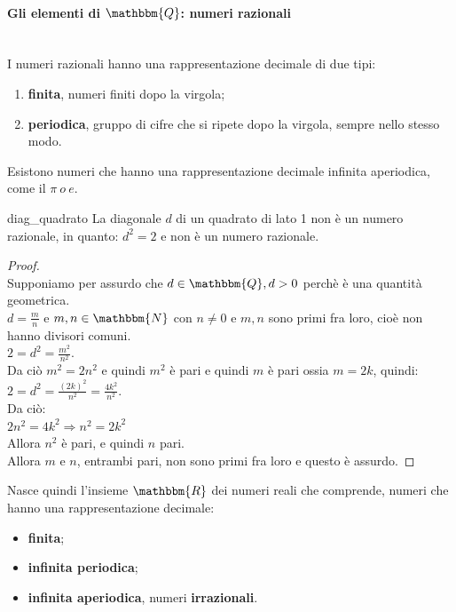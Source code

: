 \documentclass[12pt]{report}
\newcounter{theorem}
\begin{document}
	\paragraph{Gli elementi di $\mathbbm{Q}$: numeri razionali} \quad \\
	I numeri razionali hanno una rappresentazione decimale di due tipi:
	\begin{enumerate}
		\item \textbf{finita}, numeri finiti dopo la virgola;
		\item \textbf{periodica}, gruppo di cifre che si ripete dopo la virgola, sempre nello stesso modo.
	\end{enumerate}
	Esistono numeri che hanno una rappresentazione decimale infinita aperiodica, come il $\pi \ o \ e$.
	\begin{theorem}{}{diag_quadrato}
		La diagonale $d$ di un quadrato di lato 1 non è un numero razionale, in quanto: $d^2 = 2$ e non è un numero razionale.
		\begin{proof} \quad \\
			Supponiamo per assurdo che $d \in \mathbbm{Q}, d > 0$ perchè è una quantità geometrica. \\
			$d = \frac{m}{n}$ e $m,n \in \mathbbm{N}$ con $n \neq 0$ e $m,n$ sono primi fra loro, cioè non hanno divisori comuni. \\
			$2= d^2 = \frac{m^2}{n^2}$. \\
			Da ciò $m^2=2n^2$ e quindi $m^2$ è pari e quindi $m$ è pari ossia $m=2k$, quindi: \\
			$2=d^2=\frac{(2k)^2}{n^2} = \frac{4k^2}{n^2}$. \\
			Da ciò: \\
			$2n^2=4k^2 \Rightarrow n^2 = 2k^2$ \\
			Allora $n^2$ è pari, e quindi $n$ pari. \\
			Allora $m$ e $n$, entrambi pari, non sono primi fra loro e questo è assurdo.
		\end{proof}
	\end{theorem}
	Nasce quindi l'insieme $\mathbbm{R}$ dei numeri reali che comprende, numeri che hanno una rappresentazione decimale:
	\begin{itemize}
		\item \textbf{finita};
		\item \textbf{infinita periodica};
		\item \textbf{infinita aperiodica}, numeri \textbf{irrazionali}.
	\end{itemize}
\end{document}
